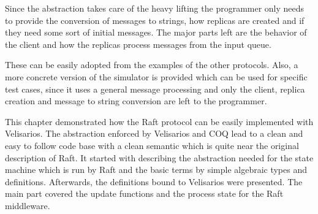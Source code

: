 Since the abstraction takes care of the heavy lifting
the programmer only needs to provide the conversion of
messages to strings, how replicas are created and if they
need some sort of initial messages. The major parts left
are the behavior of the client and how the replicas process
messages from the input queue.

These can be easily adopted from the examples of the
other protocols. Also, a more concrete version of
the simulator is provided which can be used for
specific test cases, since it uses a general message
processing and only the client, replica creation and
message to string conversion are left to the programmer.

\vspace{2em}

This chapter demonstrated how the Raft protocol can be
easily implemented with Velisarios. The abstraction
enforced by Velisarios and COQ lead to a clean and
easy to follow code base with a clean semantic which
is quite near the original description of Raft.
It started with describing the abstraction needed
for the state machine which is run by Raft and
the basic terms by simple algebraic types and
definitions. Afterwards, the definitions bound
to Velisarios were presented. The main part
covered the update functions and the process
state for the Raft middleware. 



